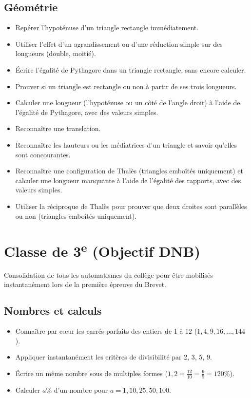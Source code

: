 \documentclass[11pt,a4paper]{article}
\begin{document}
\subsection*{Géométrie}
\begin{itemize}[label=,leftmargin=*]
    \item Repérer l'hypoténuse d'un triangle rectangle immédiatement.
    \item Utiliser l'effet d'un agrandissement ou d'une réduction simple sur des longueurs (double, moitié).
    \item Écrire l'égalité de Pythagore dans un triangle rectangle, sans encore calculer.
    \item Prouver si un triangle est rectangle ou non à partir de ses trois longueurs.
    \item Calculer une longueur (l'hypoténuse ou un côté de l'angle droit) à l'aide de l'égalité de Pythagore, avec des valeurs simples.
    \item Reconnaître une translation.
    \item Reconnaître les hauteurs ou les médiatrices d'un triangle et savoir qu'elles sont concourantes.
    \item Reconnaître une configuration de Thalès (triangles emboîtés uniquement) et calculer une longueur manquante à l'aide de l'égalité des rapports, avec des valeurs simples.
    \item Utiliser la réciproque de Thalès pour prouver que deux droites sont parallèles ou non (triangles emboîtés uniquement).
\end{itemize}

\section{Classe de 3\textsuperscript{e} (Objectif DNB)}
Consolidation de tous les automatismes du collège pour être mobilisés instantanément lors de la première épreuve du Brevet.

\subsection*{Nombres et calculs}
\begin{itemize}[label=,leftmargin=*]
    \item Connaître par cœur les carrés parfaits des entiers de 1 à 12 ($1, 4, 9, 16, \dots, 144$).
    \item Appliquer instantanément les critères de divisibilité par 2, 3, 5, 9.
    \item Écrire un même nombre sous de multiples formes ($1,2 = \frac{12}{10} = \frac{6}{5} = 120\%$).
    \item Calculer $a\%$ d'un nombre pour $a = 1, 10, 25, 50, 100$.
\end{itemize}
\end{document}
